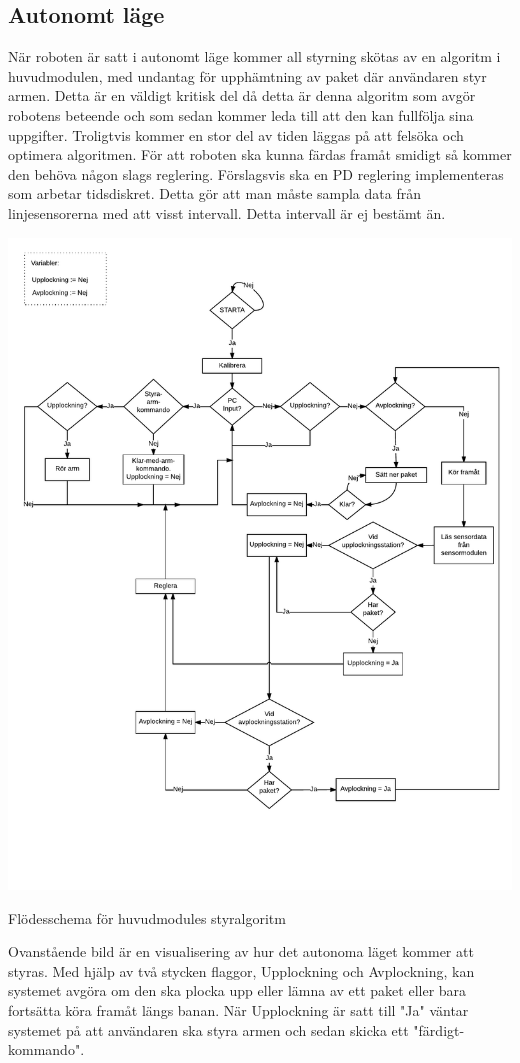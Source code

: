 \subsection{Autonomt läge}
När roboten är satt i autonomt läge kommer all styrning skötas av en algoritm i huvudmodulen, med undantag för upphämtning av paket där användaren styr armen. Detta är en väldigt kritisk del då detta är denna algoritm som avgör robotens beteende och som sedan kommer leda till att den kan fullfölja sina uppgifter. Troligtvis kommer en stor del av tiden läggas på att felsöka och optimera algoritmen.
För att roboten ska kunna färdas framåt smidigt så kommer den behöva någon slags reglering. Förslagsvis ska en PD reglering implementeras som arbetar tidsdiskret. Detta gör att man måste sampla data från linjesensorerna med att visst intervall. Detta intervall är ej bestämt än.
\newline
\newline
\centerline{\includegraphics[scale=0.6]{Styrlogik.pdf}}
\centerline{Flödesschema för huvudmodules styralgoritm}
\newline
\newline
Ovanstående bild är en visualisering av hur det autonoma läget kommer att styras. Med hjälp av två stycken flaggor, Upplockning och Avplockning, kan systemet avgöra om den ska plocka upp eller lämna av ett paket eller bara fortsätta köra framåt längs banan. När Upplockning är satt till "Ja" väntar systemet på att användaren ska styra armen och sedan skicka ett "färdigt-kommando".
